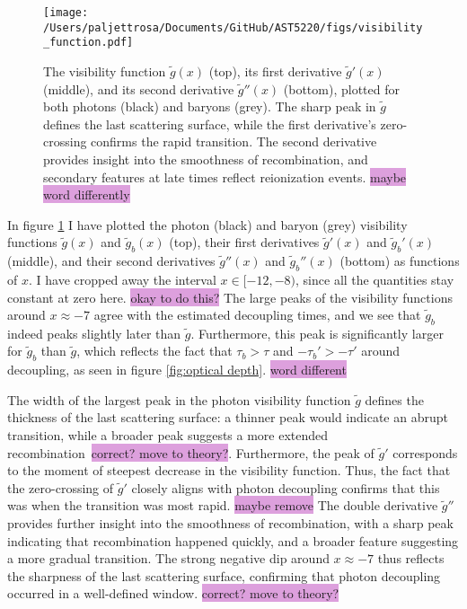 \documentclass{aa}
\begin{document}
\begin{figure}
  \centering
  \texttt{[image: /Users/paljettrosa/Documents/GitHub/AST5220/figs/visibility\_function.pdf]}
  \caption{The visibility function $\tilde{g}(x)$ (top), its first derivative $\tilde{g}'(x)$ (middle), and its second derivative $\tilde{g}''(x)$ (bottom), plotted for both photons (black) and baryons (grey). The sharp peak in $\tilde{g}$ defines the last scattering surface, while the first derivative's zero-crossing confirms the rapid transition. The second derivative provides insight into the smoothness of recombination, and secondary features at late times reflect reionization events. \colorbox{Plum}{maybe word differently}}\label{fig:visibility function}
\end{figure}

In figure \ref{fig:visibility function} I have plotted the photon (black) and baryon (grey) visibility functions $\tilde{g}(x)$ and $\tilde{g}_b(x)$ (top), their first derivatives $\tilde{g}'(x)$ and $\tilde{g}_b'(x)$ (middle), and their second derivatives $\tilde{g}''(x)$ and $\tilde{g}_b''(x)$ (bottom) as functions of $x$. I have cropped away the interval $x\in[-12,-8)$, since all the quantities stay constant at zero here. \colorbox{Plum}{okay to do this?} The large peaks of the visibility functions around $x \approx -7 $ agree with the estimated decoupling times, and we see that $\tilde{g}_b$ indeed peaks slightly later than $\tilde{g}$. Furthermore, this peak is significantly larger for $\tilde{g}_b$ than $\tilde{g}$, which reflects the fact that $\tau_b>\tau$ and $-\tau_b'>-\tau'$ around decoupling, as seen in figure \ref{fig:optical depth}. \colorbox{Plum}{word different} 

The width of the largest peak in the photon visibility function $\tilde{g}$ defines the thickness of the last scattering surface: a thinner peak would indicate an abrupt transition, while a broader peak suggests a more extended recombination \colorbox{Plum}{correct? move to theory?}. Furthermore, the peak of $\tilde{g}'$ corresponds to the moment of steepest decrease in the visibility function. Thus, the fact that the zero-crossing of $\tilde{g}'$ closely aligns with photon decoupling confirms that this was when the transition was most rapid. \colorbox{Plum}{maybe remove} The double derivative $\tilde{g}'' $ provides further insight into the smoothness of recombination, with a sharp peak indicating that recombination happened quickly, and a broader feature suggesting a more gradual transition. The strong negative dip around $ x \approx -7 $ thus reflects the sharpness of the last scattering surface, confirming that photon decoupling occurred in a well-defined window. \colorbox{Plum}{correct? move to theory?}
\end{document}
